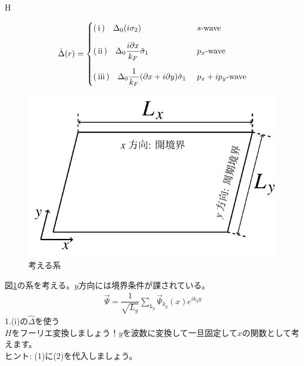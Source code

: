 H\documentclass{jarticle}
\begin{document}
\begin{align}
\hat{\Delta}(r)=
\begin{cases}
$\rm(\hspace{.18em}i\hspace{.18em})\quad$\Delta_0(i\sigma_2)
& \mbox{$s$-wave}
\vspace*{1em}\\
$\rm(\hspace{.18em}ii\hspace{.18em})$\quad\Delta_0\dfrac{i\partial x}{k_F}\hat\sigma_1
& \mbox{$p_x$-wave}
\vspace*{1em}\\
$\rm(\hspace{.18em}iii\hspace{.18em})$\quad\Delta_0\dfrac{1}{k_F}(\partial x+i\partial y)\hat\sigma_1\
& \mbox{$p_x+ip_y$-wave}
\end{cases}
\label{delta}
\end{align}
\begin{figure}[H]
	\centering
	\includegraphics[scale=1]{./figure_fix.pdf}
	\caption{考える系}
	\label{system}
\end{figure}
図\ref{system}の系を考える。$y$方向には境界条件が課されている。
\begin{align}
 \vec{\Psi}=\dfrac{1}{\sqrt{L_y}}\displaystyle\sum_{k_y}\vec{\Psi}_{k_y}(x)e^{ik_yy}
\end{align}
1.(i)の$\hat{\Delta}$を使う\\
$H$をフーリエ変換しましょう！$y$を波数に変換して一旦固定して$x$の関数として考えます。
\\ ヒント: (1)に(2)を代入しましょう。\\
\end{document}
